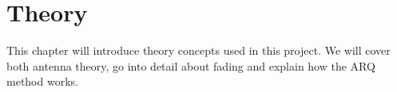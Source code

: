 \chapter{Theory}\label{ch:theory}

This chapter will introduce theory concepts used in this project. We will cover both antenna theory, go into detail about fading and explain how the ARQ method works.









